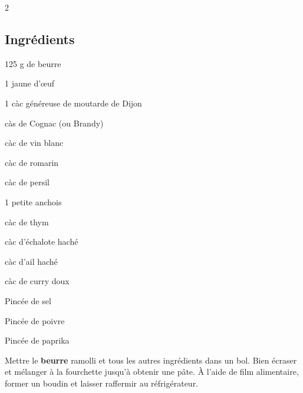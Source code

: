 \newpage
{}

\begin{multicols}{2}
	\subsection*{Ingrédients}
	\begin{ingredients}
		\item 125 g de beurre
		\item 1 jaune d'\oe{}uf
		\item 1 càc généreuse de moutarde de Dijon
		\item {} càs de Cognac (ou Brandy)
		\item {} càc de vin blanc
		\item {} càc de romarin
		\item {} càc de persil
		\item 1 petite anchois
		\item {} càc de thym
		\item {} càc d'échalote haché
		\item {} càc d'ail haché
		\item {} càc de curry doux
		\item Pincée de sel
		\item Pincée de poivre
		\item Pincée de paprika
		
	\end{ingredients}
\end{multicols}

\medskip

Mettre le \textbf{beurre} ramolli et tous les autres ingrédients dans un bol.
Bien écraser et mélanger à la fourchette jusqu’à obtenir une pâte.
À l’aide de film alimentaire, former un boudin et laisser raffermir au réfrigérateur. 

\vspace*{0.75 cm}

\begin{recipeblock}
	
\end{recipeblock}